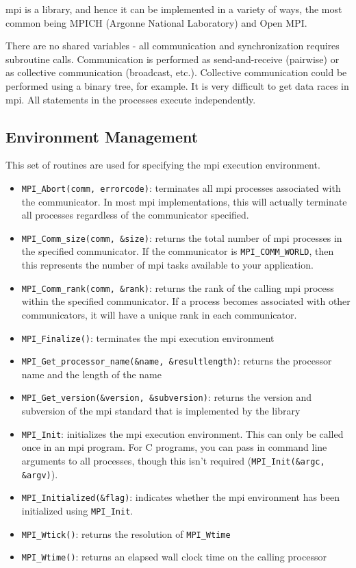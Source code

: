 \documentclass[10pt]{article}
\begin{document}
\begin{flushleft}
\gls{mpi} is a library, and hence it can be implemented in a variety of ways, the most common being MPICH (Argonne National Laboratory) and Open MPI. 

There are no shared variables - all communication and synchronization requires subroutine calls. Communication is performed as send-and-receive (pairwise) or as collective communication (broadcast, etc.). Collective communication could be performed using a binary tree, for example. It is very difficult to get data races in \gls{mpi}. All statements in the processes execute independently. 

\subsection{Environment Management}

This set of routines are used for specifying the \gls{mpi} execution environment. 

\begin{itemize}
\item {\tt MPI\_Abort(comm, errorcode)}: terminates all \gls{mpi} processes associated with the communicator. In most \gls{mpi} implementations, this will actually terminate all processes regardless of the communicator specified.
\item {\tt MPI\_Comm\_size(comm, \&size)}: returns the total number of \gls{mpi} processes in the specified communicator. If the communicator is {\tt MPI\_COMM\_WORLD}, then this represents the number of \gls{mpi} tasks available to your application.
\item {\tt MPI\_Comm\_rank(comm, \&rank)}: returns the rank of the calling \gls{mpi} process within the specified communicator. If a process becomes associated with other communicators, it will have a unique rank in each communicator.
\item {\tt MPI\_Finalize()}: terminates the \gls{mpi} execution environment
\item {\tt MPI\_Get\_processor\_name(\&name, \&resultlength)}: returns the processor name and the length of the name
\item {\tt MPI\_Get\_version(\&version, \&subversion)}: returns the version and subversion of the \gls{mpi} standard that is implemented by the library
\item {\tt MPI\_Init}: initializes the \gls{mpi} execution environment. This can only be called once in an \gls{mpi} program. For C programs, you can pass in command line arguments to all processes, though this isn't required ({\tt MPI\_Init(\&argc, \&argv)}).
\item {\tt MPI\_Initialized(\&flag)}: indicates whether the \gls{mpi} environment has been initialized using {\tt MPI\_Init}. 
\item {\tt MPI\_Wtick()}: returns the resolution of {\tt MPI\_Wtime}
\item {\tt MPI\_Wtime()}: returns an elapsed wall clock time on the calling processor
\end{itemize}


\end{flushleft}
\end{document}
